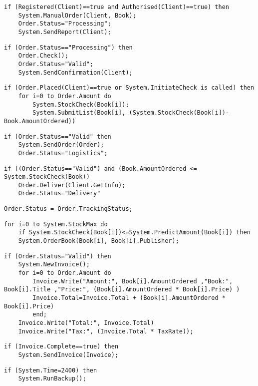 \begin{lstlisting}[caption=/PF10/ Client places Order]
if (Registered(Client)==true and Authorised(Client)==true) then  
	System.ManualOrder(Client, Book);
	Order.Status="Processing";
	System.SendReport(Client);
\end{lstlisting}
\begin{lstlisting}[caption=/PF11/ Validate Order]
if (Order.Status=="Processing") then 
	Order.Check();
	Order.Status="Valid";
	System.SendConfirmation(Client);
\end{lstlisting}
\begin{lstlisting}[caption=/PF12/ Stock Update]
if (Order.Placed(Client)==true or System.InitiateCheck is called) then
	for i=0 to Order.Amount do
		System.StockCheck(Book[i]);
		System.SubmitList(Book[i], (System.StockCheck(Book[i])-Book.AmountOrdered))
\end{lstlisting}
\begin{lstlisting}[caption=/PF13/ Forward Order to Logistics]
if (Order.Status=="Valid" then
	System.SendOrder(Order);
	Order.Status="Logistics";
\end{lstlisting}
\begin{lstlisting}[caption=/PF14/ Deliver Order]
if ((Order.Status=="Valid") and (Book.AmountOrdered <= System.StockCheck(Book))
	Order.Deliver(Client.GetInfo);
	Order.Status="Delivery"
\end{lstlisting}
\begin{lstlisting}[caption=/PF15/ Confirm Delivery]
 Order.Status = Order.TrackingStatus;
\end{lstlisting}
\begin{lstlisting}[caption=/PF16/ BookExpress Order]
 for i=0 to System.StockMax do
 	if System.StockCheck(Book[i])<=System.PredictAmount(Book[i]) then
 	System.OrderBook(Book[i], Book[i].Publisher);
\end{lstlisting}
\begin{lstlisting}[caption=/PF20/ Create Invoice]
if (Order.Status="Valid") then
	System.NewInvoice();
	for i=0 to Order.Amount do 
		Invoice.Write("Amount:", Book[i].AmountOrdered ,"Book:", Book[i].Title ,"Price:", (Book[i].AmountOrdered * Book[i].Price) )
		Invoice.Total=Invoice.Total + (Book[i].AmountOrdered * Book[i].Price)
		end;
	Invoice.Write("Total:", Invoice.Total)
	Invoice.Write("Tax:", (Invoice.Total * TaxRate));
\end{lstlisting}
\begin{lstlisting}[caption=/PF21/ Send Invoice]
  if (Invoice.Complete==true) then 
  	System.SendInvoice(Invoice);
\end{lstlisting}
\begin{lstlisting}[caption=/PF30/ Backup]
 if (System.Time=2400) then
 	System.RunBackup();
\end{lstlisting}
